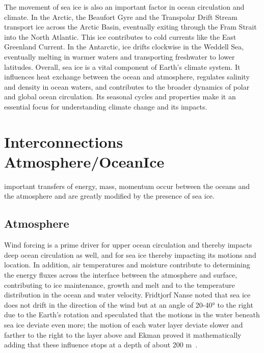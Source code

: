 The movement of sea ice is also an important factor in ocean circulation and climate. In the Arctic, the Beaufort Gyre and the Transpolar Drift Stream transport ice across the Arctic Basin, eventually exiting through the Fram Strait into the North Atlantic. This ice contributes to cold currents like the East Greenland Current. In the Antarctic, ice drifts clockwise in the Weddell Sea, eventually melting in warmer waters and transporting freshwater to lower latitudes.
Overall, sea ice is a vital component of Earth's climate system. It influences heat exchange between the ocean and atmosphere, regulates salinity and density in ocean waters, and contributes to the broader dynamics of polar and global ocean circulation. Its seasonal cycles and properties make it an essential focus for understanding climate change and its impacts.

\section{Interconnections Atmosphere/Ocean\/Ice}\label{sec:atm-ocean-ice-interconnections}
important transfers of energy, mass, momentum occur between the oceans and the atmosphere and are greatly modified by the presence of sea ice.
\subsection{Atmosphere}\label{subsec:atmosphere-interconnections}
Wind forcing is a prime driver for upper ocean circulation and thereby impacts deep ocean circulation as well, and for sea ice thereby impacting its motions and location. In addition, air temperatures and moisture contribute to determining the energy fluxes across the interface between the atmosphere and surface, contributing to ice maintenance, growth and melt and to the temperature distribution in the ocean and water velocity.
Fridtjorf Nanse noted that sea ice does not drift in the direction of the wind but at an angle of 20-40° to the right due to the Earth’s rotation and speculated that the motions in the water beneath sea ice deviate even more; the motion of each water layer deviate slower and farther to the right to the layer above and Ekman proved it mathematically adding that these influence stops at a depth of about 200 m~\citep[see e.g. Section 3.1 of][]{Zanotti2023}.

